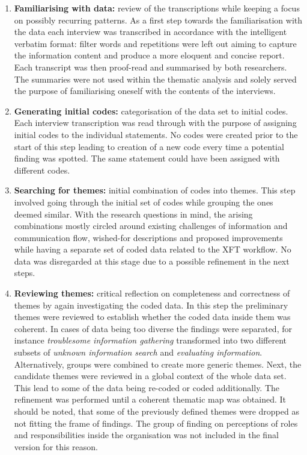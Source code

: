 \begin{enumerate}
  \item \textbf{Familiarising with data:} review of the transcriptions while keeping a focus on possibly recurring patterns. As a first step towards the familiarisation with the data each interview was transcribed in accordance with the intelligent verbatim format: filter words and repetitions were left out aiming to capture the information content and produce a more eloquent and concise report. Each transcript was then proof-read and summarised by both researchers. The summaries were not used within the thematic analysis and solely served the purpose of familiarising oneself with the contents of the interviews. 
  \item \textbf{Generating initial codes:} categorisation of the data set to initial codes. Each interview transcription was read through with the purpose of assigning initial codes to the individual statements. No codes were created prior to the start of this step leading to creation of a new code every time a potential finding was spotted. The same statement could have been assigned with different codes.
  \item \textbf{Searching for themes:} initial combination of codes into themes. This step involved going through the initial set of codes while grouping the ones deemed similar. With the research questions in mind, the arising combinations mostly circled around existing challenges of information and communication flow, wished-for descriptions and proposed improvements while having a separate set of coded data related to the XFT workflow. No data was disregarded at this stage due to a possible refinement in the next steps.
  \item \textbf{Reviewing themes:} critical reflection on completeness and correctness of themes by again investigating the coded data. In this step the preliminary themes were reviewed to establish whether the coded data inside them was coherent. In cases of data being too diverse the findings were separated, for instance \emph{troublesome information gathering} transformed into two different subsets of \emph{unknown information search} and \emph{evaluating information}. Alternatively, groups were combined to create more generic themes. Next, the candidate themes were reviewed in a global context of the whole data set. This lead to some of the data being re-coded or coded additionally. The refinement was performed until a coherent thematic map was obtained. It should be noted, that some of the previously defined themes were dropped as not fitting the frame of findings. The group of finding on perceptions of roles and responsibilities inside the organisation was not included in the final version for this reason.

\end{enumerate}
